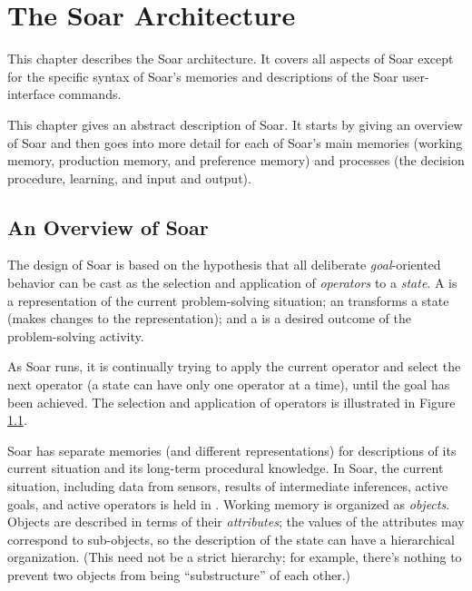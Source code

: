 \chapter{The Soar Architecture}
\label{ARCH}

This chapter describes the Soar architecture.  It covers all aspects of Soar
except for the specific syntax of Soar's memories and descriptions of the
Soar user-interface commands.

This chapter gives an abstract description of Soar.  It starts by giving
an overview of Soar and then goes into more detail for each of Soar's
main memories (working memory, production memory, and preference memory)
and processes (the decision procedure, learning, and input and output).

\section{An Overview of Soar}
\label{ARCH-overview}

The design of Soar is based on the hypothesis that all deliberate
\textit{goal}-oriented behavior can be cast as the selection and application
of \textit{operators} to a \textit{state}. A  is a representation of the
current problem-solving situation; an  transforms a state (makes
changes to the representation); and a  is a desired outcome of the
problem-solving activity.

As Soar runs, it is continually trying to apply the current operator and
select the next operator (a state can have only one operator at a time),
until the goal has been achieved. The selection and application of
operators is illustrated in Figure \ref{fig:select-apply}. 

\begin{figure}
\label{fig:select-apply}
\end{figure}

Soar has separate memories (and different representations) for
descriptions of its current situation and its long-term procedural knowledge.  In
Soar, the current situation, including data from sensors, results of
intermediate inferences, active goals, and active operators is held in
.  Working memory is organized as
\emph{objects}. Objects are described in terms of their
\emph{attributes}; the values of the attributes may correspond to
sub-objects, so the description of the state can have a hierarchical
organization. (This need not be a strict hierarchy; for example, there's
nothing to prevent two objects from being ``substructure'' of each
other.)

